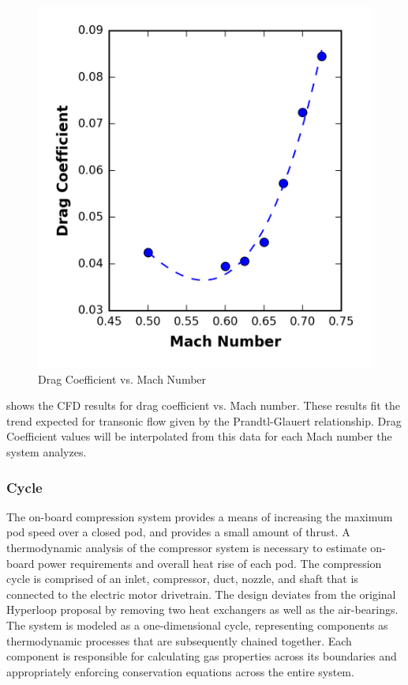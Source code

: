 	\begin{figure}
		\centering
		\includegraphics{../../images/graphs/cd_vs_mach/cd_vs_mach.png}
		\caption{Drag Coefficient vs. Mach Number}
		\label{fig:cd_vs_mach}
	\end{figure}
	 shows the CFD results for drag coefficient vs. Mach number.
	These results fit the trend expected for transonic flow given by the
	Prandtl-Glauert relationship. Drag Coefficient values will be interpolated
	from this data for each Mach number the system analyzes.
\subsubsection{Cycle}
	The on-board compression system provides a means of increasing the maximum
	pod speed over a closed pod,  and provides a small amount of thrust.
	A thermodynamic analysis of the compressor system is necessary to estimate
	on- board power requirements and overall heat rise of each pod.
	The compression cycle is comprised of an inlet, compressor, duct, nozzle,
	and shaft that is connected to the electric motor drivetrain. The design
	deviates from the original Hyperloop proposal by removing two heat
	exchangers as well as the air-bearings. The system is modeled as a
	one-dimensional cycle, representing components as thermodynamic processes
	that are subsequently chained together. Each component is responsible for
	calculating gas properties across its boundaries and appropriately enforcing
	conservation equations across the entire system.
